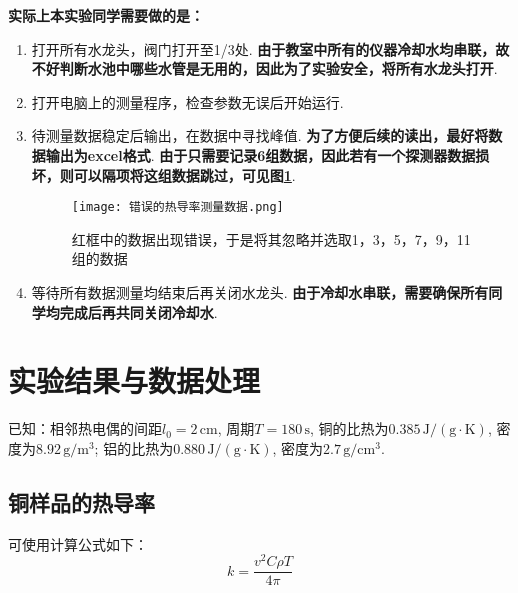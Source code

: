 \documentclass[11pt]{article}
\begin{document}
\textbf{实际上本实验同学需要做的是：}
\begin{enumerate}
	\item 打开所有水龙头，阀门打开至1/3处.\newline
	\textbf{由于教室中所有的仪器冷却水均串联，故不好判断水池中哪些水管是无用的，因此为了实验安全，将所有水龙头打开}.
	\item 打开电脑上的测量程序，检查参数无误后开始运行.
	\item 待测量数据稳定后输出，在数据中寻找峰值.\newline
	\textbf{为了方便后续的读出，最好将数据输出为excel格式}.\newline
	\textbf{由于只需要记录6组数据，因此若有一个探测器数据损坏，则可以隔项将这组数据跳过，可见图\ref{fig:wrong sensor}}.
	\begin{figure}
		\centering
		\texttt{[image: 错误的热导率测量数据.png]}
		\caption{红框中的数据出现错误，于是将其忽略并选取1，3，5，7，9，11组的数据}
		\label{fig:wrong sensor}
	\end{figure}
	\item 等待所有数据测量均结束后再关闭水龙头.\newline
	\textbf{由于冷却水串联，需要确保所有同学均完成后再共同关闭冷却水}.
\end{enumerate}

\section{实验结果与数据处理}
已知：相邻热电偶的间距$ l_0=2\,\mathrm{cm} $, 周期$ T=180\,\mathrm{s} $, 铜的比热为$ 0.385\,\mathrm{J/(g\cdot K)} $, 密度为$ 8.92\,\mathrm{g/m^3} $; 铝的比热为$ 0.880\,\mathrm{J/(g\cdot K)} $, 密度为$ 2.7\,\mathrm{g/cm^3} $. 
\subsection{铜样品的热导率}

可使用计算公式如下：
\[
k = \frac{v^2C\rho T}{4\pi}
\]
\end{document}
